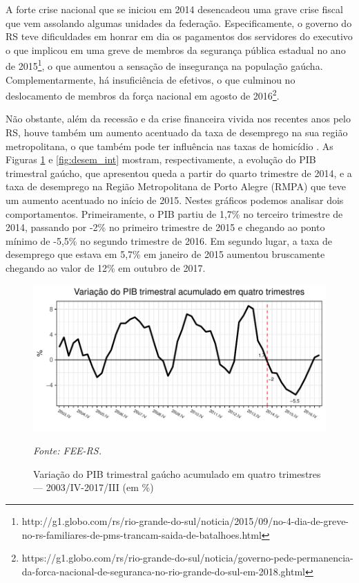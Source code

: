 \documentclass[12pt,openright,oneside,a4paper,english,french,spanish]{abntex2}
\numberwithin{table}{section} %
\numberwithin{figure}{section} %
\newcommand{\source}[1]{\textit{#1}}
\begin{document}
A forte crise nacional que se iniciou em 2014 desencadeou uma grave crise fiscal que vem assolando algumas unidades da federação. Especificamente, o governo do RS teve dificuldades em honrar em dia os pagamentos dos servidores do executivo o que implicou em uma greve de membros da segurança pública estadual no ano de 2015\footnote{http://g1.globo.com/rs/rio-grande-do-sul/noticia/2015/09/no-4-dia-de-greve-no-rs-familiares-de-pms-trancam-saida-de-batalhoes.html}, o que aumentou a sensação de insegurança na população gaúcha. Complementarmente, há insuficiência de efetivos, o que culminou no deslocamento de membros da força nacional em agosto de 2016\footnote{https://g1.globo.com/rs/rio-grande-do-sul/noticia/governo-pede-permanencia-da-forca-nacional-de-seguranca-no-rio-grande-do-sul-em-2018.ghtml}.

Não obstante, além da recessão e da crise financeira vivida nos recentes anos pelo RS, houve também um aumento acentuado da taxa de desemprego na sua região metropolitana, o que também pode ter influência nas taxas de homicídio \cite{cerqueira2015efeito}. As Figuras \ref{fig:pib_int} e \ref{fig:desem_int} mostram, respectivamente, a evolução do PIB trimestral gaúcho, que apresentou queda a partir do quarto trimestre de 2014, e a taxa de desemprego na Região Metropolitana de Porto Alegre (RMPA) que teve um aumento acentuado no início de 2015. Nestes gráficos podemos analisar dois comportamentos. Primeiramente, o PIB partiu de 1,7\% no terceiro trimestre de 2014, passando por -2\% no primeiro trimestre de 2015 e chegando ao ponto mínimo de -5,5\% no segundo trimestre de 2016. Em segundo lugar, a taxa de desemprego que estava em 5,7\% em janeiro de 2015 aumentou bruscamente chegando ao valor de 12\% em outubro de 2017.

\begin{figure}[H]
\begin{center}
\includegraphics{TESE_DE_DOUTORADO_RENAN_FINAL-plot_pib_introducao}
\end{center}
\caption{Variação do PIB trimestral gaúcho acumulado em quatro trimestres — 2003/IV-2017/III (em \%)}
\source{Fonte: FEE-RS.}
\label{fig:pib_int}
\end{figure}
\end{document}
